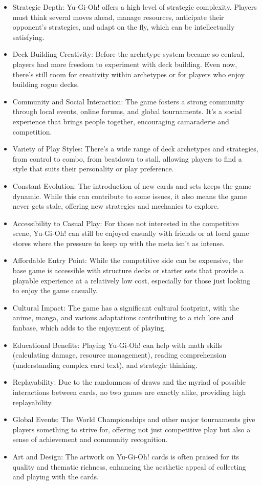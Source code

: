 \begin{itemize}
\item Strategic Depth: Yu-Gi-Oh! offers a high level of strategic complexity. Players must think several moves ahead, manage resources, anticipate their opponent's strategies, and adapt on the fly, which can be intellectually satisfying.
\item Deck Building Creativity: Before the archetype system became so central, players had more freedom to experiment with deck building. Even now, there's still room for creativity within archetypes or for players who enjoy building rogue decks.
\item Community and Social Interaction: The game fosters a strong community through local events, online forums, and global tournaments. It's a social experience that brings people together, encouraging camaraderie and competition.
\item Variety of Play Styles: There's a wide range of deck archetypes and strategies, from control to combo, from beatdown to stall, allowing players to find a style that suits their personality or play preference.
\item Constant Evolution: The introduction of new cards and sets keeps the game dynamic. While this can contribute to some issues, it also means the game never gets stale, offering new strategies and mechanics to explore.
\item Accessibility to Casual Play: For those not interested in the competitive scene, Yu-Gi-Oh! can still be enjoyed casually with friends or at local game stores where the pressure to keep up with the meta isn't as intense.
\item Affordable Entry Point: While the competitive side can be expensive, the base game is accessible with structure decks or starter sets that provide a playable experience at a relatively low cost, especially for those just looking to enjoy the game casually.
\item Cultural Impact: The game has a significant cultural footprint, with the anime, manga, and various adaptations contributing to a rich lore and fanbase, which adds to the enjoyment of playing.
\item Educational Benefits: Playing Yu-Gi-Oh! can help with math skills (calculating damage, resource management), reading comprehension (understanding complex card text), and strategic thinking.
\item Replayability: Due to the randomness of draws and the myriad of possible interactions between cards, no two games are exactly alike, providing high replayability.
\item Global Events: The World Championships and other major tournaments give players something to strive for, offering not just competitive play but also a sense of achievement and community recognition.
\item Art and Design: The artwork on Yu-Gi-Oh! cards is often praised for its quality and thematic richness, enhancing the aesthetic appeal of collecting and playing with the cards.
\end{itemize}

